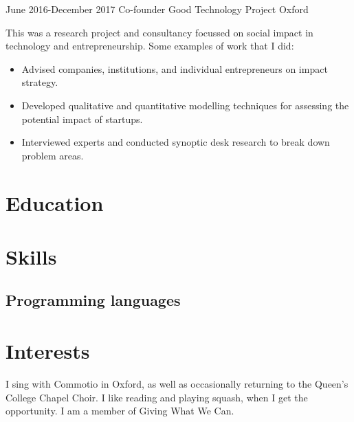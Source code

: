 \documentclass[12pt,a4paper,sans]{moderncv}
\begin{document}
\cventry
{June 2016-December 2017}
{Co-founder}
{Good Technology Project}
{Oxford}
{}
{
  This was a research project and consultancy focussed on social impact in technology and
  entrepreneurship. Some examples of work that I did:
  \begin{itemize}
    \item Advised companies, institutions, and individual entrepreneurs on impact strategy.
    \item Developed qualitative and quantitative modelling techniques for
      assessing the potential impact of startups.
    \item Interviewed experts and conducted synoptic desk research to break down problem areas.
  \end{itemize}
}

\nocite{*}
\printbibliography[title={Publications}]

\section{Education}

\section{Skills}

\subsection{Programming languages}


\section{Interests}
I sing with Commotio in Oxford, as well as occasionally returning to the Queen's
College Chapel Choir. I like reading and playing squash, when I get the
opportunity. I am a member of Giving What We Can.
\end{document}
